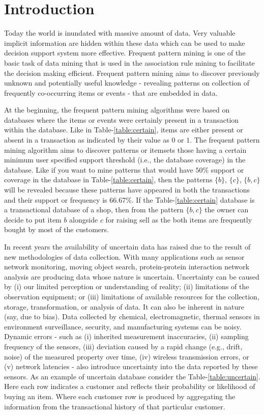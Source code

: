 \section{Introduction}
Today the world is inundated with massive amount of data. Very valuable implicit information are hidden within  these data which can be used to make decision support system more effective. Frequent pattern mining is one of the basic task of data mining that is used in the association rule mining to facilitate the decision making efficient.
Frequent pattern mining aims to discover  previously unknown and potentially useful knowledge - revealing patterns on collection of frequently co-occurring items or events - that are embedded in data.



At the beginning, the frequent pattern mining algorithms were based on databases where the items or events were certainly present in a transaction within the database. Like in Table-\ref{table:certain}, items are either present or absent in a transaction as indicated by their value as $0$ or $1$. The frequent pattern mining algorithm aims to discover patterns or itemsets those having a certain minimum user specified support threshold (i.e., the database coverage) in the database. Like if you want to mine patterns that would have $50\%$ support or coverage in the database in Table-\ref{table:certain}, then the patterns $\big\{ b \big\}$, $\big\{ c \big\}$, $\big\{ b, c \big\}$ will be revealed because these patterns have appeared in both the transactions and their support or frequency is $66.67\%$. If the Table-\ref{table:certain} database is a transactional database of a shop, then from the pattern $\big\{ b, c \big\}$ the owner can decide to put item $b$ alongside $c$ for raising sell as the both items are frequently bought by most of the customers.

In recent years the availability of uncertain data has raised due to the result of new methodologies of data collection. With many applications such as sensor network monitoring, moving object search, protein-protein interaction network analysis are producing data whose nature is uncertain. Uncertainty can be caused by (i) our limited perception or understanding of reality; (ii) limitations of the observation equipment; or (iii) limitations of available resources for the collection, storage, transformation, or analysis of data. It can also be inherent in nature (say, due to bias). Data collected by chemical, electromagnetic, thermal sensors in environment surveillance, security, and manufacturing systems can be noisy. Dynamic  errors - such as (i) inherited measurement inaccuracies, (ii) sampling frequency of the sensors, (iii) deviation caused by a rapid change (e.g., drift, noise) of the measured property over time, (iv) wireless transmission errors, or (v) network latencies - also introduce uncertainty into the data reported by these sensors. As an example of uncertain database consider the Table-\ref{table:uncertain}. Here each row indicates a customer and reflects their probability or likelihood of buying an item. Where each customer row is produced by aggregating the information from the transactional history of that particular customer.


